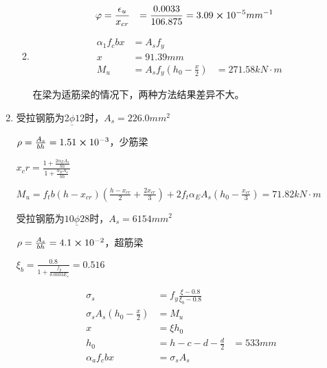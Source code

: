 \documentclass{article}
\begin{document}
\begin{questionList}
\begin{enumerate}
\begin{enumerate}
\begin{align*}
                                    \varphi                        & =\frac{\epsilon_u}{x_{cr}}  & =\frac{0.0033}{106.875} & =3.09\cross10^{-5}mm^{-1}
                              \end{align*}
                        \item \begin{align*}
                                    \alpha_1f_cbx & =A_sf_y                                     \\
                                    x             & =91.39mm                                    \\
                                    M_u           & =A_sf_y(h_0-\frac{x}{2}) & =271.58kN\cdot m
                              \end{align*}
                              \par 在梁为适筋梁的情况下，两种方法结果差异不大。
                  \end{enumerate}
            \item 受拉钢筋为2$\underline{\phi}12$时，$A_s=226.0mm^2$
                  \par $\rho=\frac{A_s}{bh}=1.51\cross10^{-3}$，少筋梁
                  \par $x_cr=\frac{1+\frac{2\alpha_EA_s}{bh}}{1+\frac{\alpha_EA_s}{bh}}$
                  \par $M_u=f_tb(h-x_{cr})(\frac{h-x_{cr}}{2}+\frac{2x_{cr}}{3})+2f_t\alpha_EA_s(h_0-\frac{x_{cr}}{3})=71.82kN\cdot m$
                  \par 受拉钢筋为$10\underline{\phi}28$时，$A_s=6154mm^2$
                  \par $\rho=\frac{A_s}{bh}=4.1\cross10^{-2}$，超筋梁
                  \par $\xi_b=\frac{0.8}{1+\frac{f_y}{0.0033E_s}}=0.516$
                  \par \begin{align*}
                        \sigma_s                     & =f_y\frac{\xi-0.8}{\xi_b-0.8}                    \\
                        \sigma_sA_s(h_0-\frac{x}{2}) & =M_u                                             \\
                        x                            & =\xi h_0                                         \\
                        h_0                          & = h-c-d-\frac{d}{2}           & =533mm           \\
                        \alpha_af_cbx                & =\sigma_sA_s                                     \\

\end{align*}
\end{enumerate}
\end{questionList}
\end{document}
